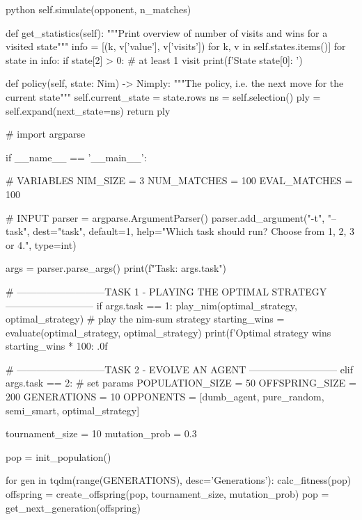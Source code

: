 \begin{mintedbox}{python}
                        self.simulate(opponent, n_matches)

        def get_statistics(self):
            """Print overview of number of visits and wins for a visited state"""
            info = [(k, v['value'], v['visits']) for k, v in self.states.items()]
            for state in info:
                if state[2] > 0:  # at least 1 visit
                    print(f'State {state[0]}:  ')

        def policy(self, state: Nim) -> Nimply:
            """The policy, i.e. the next move for the current state"""
            self.current_state = state.rows
            ns = self.selection()
            ply = self.expand(next_state=ns)
            return ply

    # %
    import argparse

    if __name__ == '__main__':

        # VARIABLES
        NIM_SIZE = 3
        NUM_MATCHES = 100
        EVAL_MATCHES = 100

        # INPUT
        parser = argparse.ArgumentParser()
        parser.add_argument("-t", "--task", dest="task", default=1,
                            help="Which task should run? Choose from 1, 2, 3 or 4.", type=int)

        args = parser.parse_args()
        print(f"Task: {args.task}")

        # ---------------------------TASK 1 - PLAYING THE OPTIMAL STRATEGY ---------------------------
        if args.task == 1:
            play_nim(optimal_strategy, optimal_strategy)
            # play the nim-sum strategy
            starting_wins = evaluate(optimal_strategy, optimal_strategy)
            print(f'Optimal strategy wins {starting_wins * 100: .0f}%

        # ---------------------------TASK 2 - EVOLVE AN AGENT ---------------------------
        elif args.task == 2:
            # set params
            POPULATION_SIZE = 50
            OFFSPRING_SIZE = 200
            GENERATIONS = 10
            OPPONENTS = [dumb_agent, pure_random, semi_smart, optimal_strategy]

            tournament_size = 10
            mutation_prob = 0.3

            pop = init_population()

            for gen in tqdm(range(GENERATIONS), desc='Generations'):
                calc_fitness(pop)
                offspring = create_offspring(pop, tournament_size, mutation_prob)
                pop = get_next_generation(offspring)


\end{mintedbox}
